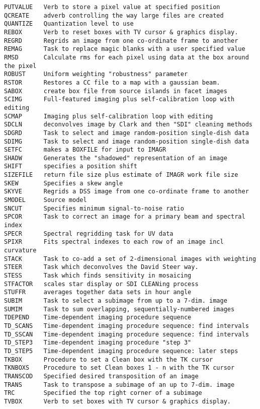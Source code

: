 \begin{verbatim}
PUTVALUE   Verb to store a pixel value at specified position
QCREATE    adverb controlling the way large files are created
QUANTIZE   Quantization level to use
REBOX      Verb to reset boxes with TV cursor & graphics display.
REGRD      Regrids an image from one co-ordinate frame to another
REMAG      Task to replace magic blanks with a user specified value
RMSD       Calculate rms for each pixel using data at the box around the pixel
ROBUST     Uniform weighting "robustness" parameter
RSTOR      Restores a CC file to a map with a gaussian beam.
SABOX      create box file from source islands in facet images
SCIMG      Full-featured imaging plus self-calibration loop with editing
SCMAP      Imaging plus self-calibration loop with editing
SDCLN      deconvolves image by Clark and then "SDI" cleaning methods
SDGRD      Task to select and image random-position single-dish data
SDIMG      Task to select and image random-position single-dish data
SETFC      makes a BOXFILE for input to IMAGR
SHADW      Generates the "shadowed" representation of an image
SHIFT      specifies a position shift
SIZEFILE   return file size plus estimate of IMAGR work file size
SKEW       Specifies a skew angle
SKYVE      Regrids a DSS image from one co-ordinate frame to another
SMODEL     Source model
SNCUT      Specifies minimum signal-to-noise ratio
SPCOR      Task to correct an image for a primary beam and spectral index
SPECR      Spectral regridding task for UV data
SPIXR      Fits spectral indexes to each row of an image incl curvature
STACK      Task to co-add a set of 2-dimensional images with weighting
STEER      Task which deconvolves the David Steer way.
STESS      Task which finds sensitivity in mosaicing
STFACTOR   scales star display or SDI CLEANing process
STUFFR     averages together data sets in hour angle
SUBIM      Task to select a subimage from up to a 7-dim. image
SUMIM      Task to sum overlapping, sequentially-numbered images
TDEPEND    Time-dependent imaging procedure sequence
TD_SCANS   Time-dependent imaging procedure sequence: find intervals
TD_SSCAN   Time-dependent imaging procedure sequence: find intervals
TD_STEP3   Time-dependent imaging procedure "step 3"
TD_STEP5   Time-dependent imaging procedure sequence: later steps
TKBOX      Procedure to set a Clean box with the TK cursor
TKNBOXS    Procedure to set Clean boxes 1 - n with the TK cursor
TRANSCOD   Specified desired transposition of an image
TRANS      Task to transpose a subimage of an up to 7-dim. image
TRC        Specified the top right corner of a subimage
TVBOX      Verb to set boxes with TV cursor & graphics display.

\end{verbatim}
